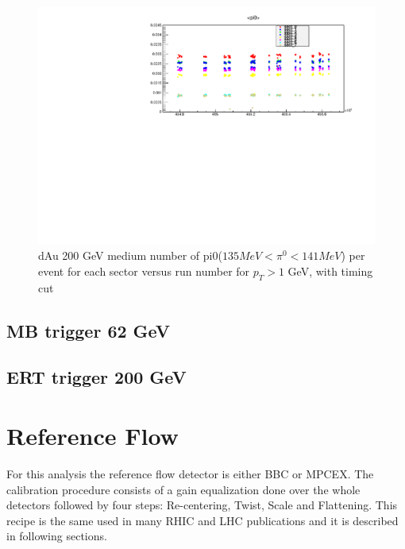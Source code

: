 \documentclass{article}
\begin{document}
\begin{figure}
    \centering
    \includegraphics[width=1\textwidth]{fig_pi0vn/meanpi0_withtiming.pdf}
    \caption{dAu 200 GeV  medium number of pi0($135 MeV <\pi^0 < 141 MeV$) per event for each sector versus run number for $p_{T}>1$ GeV, with timing cut}
    \label{meanpi0_withtiming}
\end{figure}
\subsection{MB trigger 62 GeV}
\subsection{ERT trigger 200 GeV}

\section{Reference Flow}
For this analysis the reference flow detector is either BBC or MPCEX.
The calibration procedure consists of a gain equalization done over the whole detectors followed by four steps: Re-centering, Twist, Scale and Flattening.
This recipe is the same used in many RHIC and LHC publications and it is described in following sections.
\end{document}
